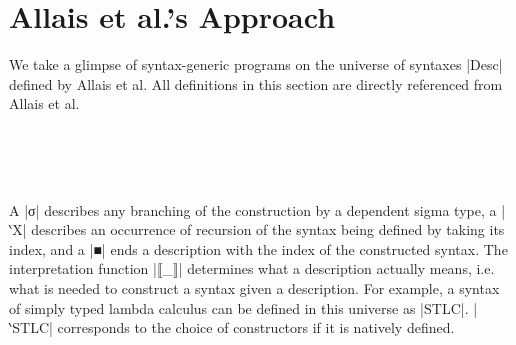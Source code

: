 \documentclass[sigplan,review,fleqn]{acmart}
\renewcommand{\verb}{\collectverb{\color{AgdaFunction}}}
\newcommand{\con}{\collectverb{\color{AgdaInductiveConstructor}}}
\begin{document}
\section{Allais et al.'s Approach}
\label{sec:recap}
We take a glimpse of syntax-generic programs on the universe of syntaxes \verb|Desc| defined by Allais et al.
All definitions in this section are directly referenced from Allais et al.
\begin{code}
	\>[0]\AgdaSpace{}%
	\AgdaSpace{}%
	\AgdaSymbol{(}\AgdaSpace{}%
	\AgdaSymbol{:}\AgdaSpace{}%
	\AgdaSymbol{)}\AgdaSpace{}%
	\AgdaSymbol{:}\AgdaSpace{}%
	\AgdaSpace{}%
	\<%
	\\
	\>[0][@{}l@{\AgdaIndent{0}}]%
	\>[2]%
	\>[5]\AgdaSymbol{:}\AgdaSpace{}%
	\AgdaSymbol{(}\AgdaSpace{}%
	\AgdaSymbol{:}\AgdaSpace{}%
	\AgdaSymbol{)}\AgdaSpace{}%
	\AgdaSpace{}%
	\AgdaSymbol{(}\AgdaSpace{}%
	\AgdaSpace{}%
	\AgdaSpace{}%
	\AgdaSymbol{)}\AgdaSpace{}%
	\AgdaSpace{}%
	\AgdaSpace{}%
	\<%
	\\
	\>[2]\AgdaSpace{}%
	\AgdaSymbol{:}\AgdaSpace{}%
	\AgdaSpace{}%
	\AgdaSpace{}%
	\AgdaSpace{}%
	\AgdaSpace{}%
	\AgdaSpace{}%
	\AgdaSpace{}%
	\AgdaSpace{}%
	\AgdaSpace{}%
	\AgdaSpace{}%
	\<%
	\\
	\>[2]%
	\>[5]\AgdaSymbol{:}\AgdaSpace{}%
	\AgdaSpace{}%
	\AgdaSpace{}%
	\AgdaSpace{}%
	\<%
\end{code}
A \con|σ| describes any branching of the construction by a dependent sigma type, a \con|‵X| describes an occurrence of recursion of the syntax being defined by taking its index, and a \con|■| ends a description with the index of the constructed syntax.
The interpretation function \verb|⟦_⟧| determines what a description actually means, i.e. what is needed to construct a syntax given a description.
For example, a syntax of simply typed lambda calculus can be defined in this universe as \verb|STLC|.
\verb|‵STLC| corresponds to the choice of constructors if it is natively defined.
\end{document}
